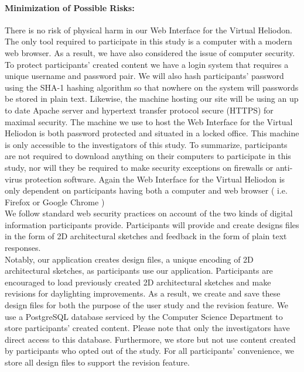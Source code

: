 \documentclass[12pt]{article}
\begin{document}
\paragraph{Minimization of Possible Risks:}   
% 
There is no risk of physical harm in our Web Interface for the Virtual Heliodon.
The only tool required to participate in this study is a computer with a modern web browser.
As a result, we have also considered the issue of computer security. 
To protect participants' created content we have a login system that requires a unique username and password pair.
We will also hash participants' password using the SHA-1 hashing algorithm so that nowhere on the system will passwords be stored in plain text.
Likewise, the machine hosting our site will be using an up to date Apache server and hypertext transfer protocol secure (HTTPS) for maximal security. 
The machine we use to host the Web Interface for the Virtual Heliodon is both password protected and situated in a locked office.
This machine is only accessible to the investigators of this study.
To summarize, participants are not required to download anything on their computers to participate in this study, nor will they be required to make security exceptions on firewalls or anti-virus protection software.
Again the Web Interface for the Virtual Heliodon is only dependent on participants having both a computer and web browser ( i.e. Firefox or Google Chrome )\\

We follow standard web security practices on account of the two kinds of digital information participants provide.
Participants will provide and create designs files in the form of 2D architectural sketches and feedback in the form of plain text responses.\\

Notably, our application creates design files, a unique encoding of 2D architectural sketches, as participants  use our application.
Participants are encouraged to load previously created 2D architectural sketches and make revisions for daylighting improvements.
As a result, we create and save these design files for both the purpose of the user study and the revision feature. 
We use a PostgreSQL database serviced by the Computer Science Department to store participants' created content. 
Please note that only the investigators have direct access to this database. Furthermore, we store but not use content created by participants who opted out of the study. 
For all participants' convenience, we store all design files to support the revision feature. \\
\end{document}
